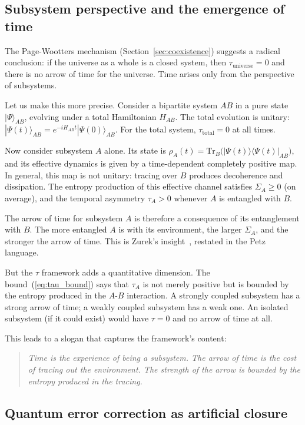 \documentclass[12pt]{article}
\theoremstyle{definition}
\theoremstyle{remark}
\newcommand{\Tr}{\mathrm{Tr}}
\newcommand{\ket}[1]{|#1\rangle}
\newcommand{\op}[2]{|#1\rangle\langle#2|}
\newcommand{\tauasym}{\tau}
\begin{document}
\subsection{Subsystem perspective and the emergence of time}

The Page-Wootters mechanism (Section~\ref{sec:coexistence})
suggests a radical conclusion: if the universe as a whole is a
closed system, then $\tauasym_{\text{universe}} = 0$ and there
is no arrow of time for the universe.  Time arises only from the
perspective of subsystems.

Let us make this more precise.  Consider a bipartite system
$AB$ in a pure state $\ket{\Psi}_{AB}$, evolving under a total
Hamiltonian $H_{AB}$.  The total evolution is unitary:
$\ket{\Psi(t)}_{AB} = e^{-iH_{AB}t}\ket{\Psi(0)}_{AB}$.
For the total system, $\tauasym_{\text{total}} = 0$ at all times.

Now consider subsystem $A$ alone.  Its state is
$\rho_A(t) = \Tr_B\big(\op{\Psi(t)}{\Psi(t)}_{AB}\big)$,
and its effective dynamics is given by a time-dependent
completely positive map.  In general, this map is not unitary:
tracing over $B$ produces decoherence and dissipation.
The entropy production of this effective channel satisfies
$\Sigma_A \geq 0$ (on average), and the temporal asymmetry
$\tauasym_A > 0$ whenever $A$ is entangled with $B$.

The arrow of time for subsystem $A$ is therefore a consequence
of its entanglement with $B$.  The more entangled $A$ is with
its environment, the larger $\Sigma_A$, and the stronger the
arrow of time.  This is Zurek's insight~\cite{Zurek2003},
restated in the Petz language.

But the $\tauasym$ framework adds a quantitative dimension.
The bound~(\ref{eq:tau_bound}) says that $\tauasym_A$ is not
merely positive but is bounded by the entropy produced in the
$A$-$B$ interaction.  A strongly coupled subsystem has a strong
arrow of time; a weakly coupled subsystem has a weak one.
An isolated subsystem (if it could exist) would have $\tauasym = 0$
and no arrow of time at all.

This leads to a slogan that captures the framework's content:
\begin{quote}
\emph{Time is the experience of being a subsystem.  The arrow of
time is the cost of tracing out the environment.  The strength of
the arrow is bounded by the entropy produced in the tracing.}
\end{quote}

\subsection{Quantum error correction as artificial closure}
\end{document}
